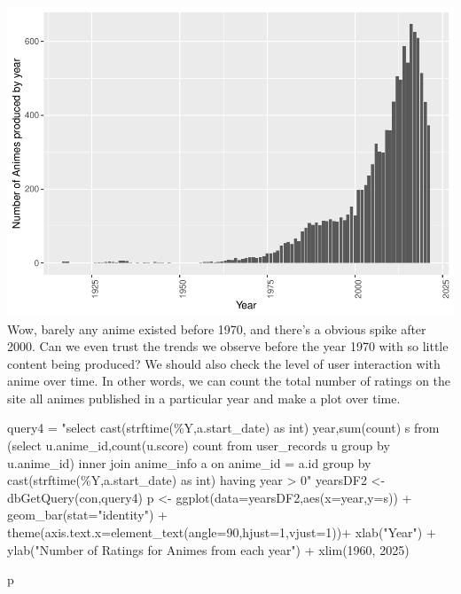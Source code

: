 \documentclass[
]{article}
\newenvironment{Shaded}{\begin{snugshade}}{\end{snugshade}}
\newcommand{\AttributeTok}[1]{\textcolor[rgb]{0.77,0.63,0.00}{#1}}
\newcommand{\DecValTok}[1]{\textcolor[rgb]{0.00,0.00,0.81}{#1}}
\newcommand{\FunctionTok}[1]{\textcolor[rgb]{0.00,0.00,0.00}{#1}}
\newcommand{\NormalTok}[1]{#1}
\newcommand{\OtherTok}[1]{\textcolor[rgb]{0.56,0.35,0.01}{#1}}
\newcommand{\SpecialCharTok}[1]{\textcolor[rgb]{0.00,0.00,0.00}{#1}}
\newcommand{\StringTok}[1]{\textcolor[rgb]{0.31,0.60,0.02}{#1}}
\begin{document}
\includegraphics{R_analysis_files/figure-latex/unnamed-chunk-8-1.pdf}
Wow, barely any anime existed before 1970, and there's a obvious spike
after 2000. Can we even trust the trends we observe before the year 1970
with so little content being produced? We should also check the level of
user interaction with anime over time. In other words, we can count the
total number of ratings on the site all animes published in a particular
year and make a plot over time.

\begin{Shaded}
\begin{Highlighting}[]
\NormalTok{query4 }\OtherTok{=} \StringTok{"select cast(strftime(\textquotesingle{}\%Y\textquotesingle{},a.start\_date) as int) year,sum(count) s from}
\StringTok{(select u.anime\_id,count(u.score) count from user\_records u group by u.anime\_id) inner join anime\_info a on anime\_id = a.id}
\StringTok{group by cast(strftime(\textquotesingle{}\%Y\textquotesingle{},a.start\_date) as int) having year \textgreater{} 0"}
\NormalTok{yearsDF2 }\OtherTok{\textless{}{-}} \FunctionTok{dbGetQuery}\NormalTok{(con,query4)}
\NormalTok{p }\OtherTok{\textless{}{-}} \FunctionTok{ggplot}\NormalTok{(}\AttributeTok{data=}\NormalTok{yearsDF2,}\FunctionTok{aes}\NormalTok{(}\AttributeTok{x=}\NormalTok{year,}\AttributeTok{y=}\NormalTok{s)) }\SpecialCharTok{+}
  \FunctionTok{geom\_bar}\NormalTok{(}\AttributeTok{stat=}\StringTok{"identity"}\NormalTok{) }\SpecialCharTok{+}
  \FunctionTok{theme}\NormalTok{(}\AttributeTok{axis.text.x=}\FunctionTok{element\_text}\NormalTok{(}\AttributeTok{angle=}\DecValTok{90}\NormalTok{,}\AttributeTok{hjust=}\DecValTok{1}\NormalTok{,}\AttributeTok{vjust=}\DecValTok{1}\NormalTok{))}\SpecialCharTok{+}
  \FunctionTok{xlab}\NormalTok{(}\StringTok{"Year"}\NormalTok{) }\SpecialCharTok{+} \FunctionTok{ylab}\NormalTok{(}\StringTok{"Number of Ratings for Animes from each year"}\NormalTok{) }\SpecialCharTok{+}
  \FunctionTok{xlim}\NormalTok{(}\DecValTok{1960}\NormalTok{, }\DecValTok{2025}\NormalTok{)}

\NormalTok{p}
\end{Highlighting}
\end{Shaded}
\end{document}
